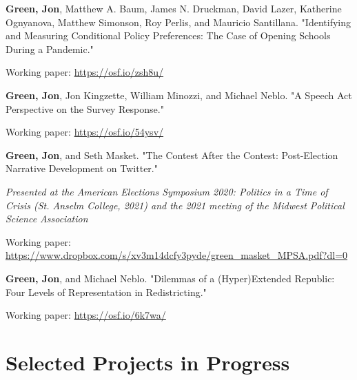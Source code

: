 \documentclass[letterpaper]{article}
\renewenvironment{itemize}{
  \begin{list}{}{
    \setlength{\leftmargin}{1.5em}
  }
}{
  \end{list}
}
\begin{document}
\begin{itemize}
\item  \textbf{Green, Jon}, Matthew A. Baum, James N. Druckman, David Lazer, Katherine Ognyanova, Matthew Simonson, Roy Perlis, and Mauricio Santillana. "Identifying and Measuring Conditional Policy Preferences: The Case of Opening Schools During a Pandemic." 
\begin{itemize}
\item Working paper: \url{https://osf.io/zsh8u/}
\end{itemize}

\item \textbf{Green, Jon}, Jon Kingzette, William Minozzi, and Michael Neblo. "A Speech Act Perspective on the Survey Response." 
\begin{itemize}
\item Working paper: \url{https://osf.io/54ysv/}
\end{itemize}

\item \textbf{Green, Jon}, and Seth Masket. "The Contest After the Contest: Post-Election Narrative Development on Twitter." 
\begin{itemize}
\item \textit{Presented at the American Elections Symposium 2020: Politics in a Time of Crisis (St. Anselm College, 2021) and the 2021 meeting of the Midwest Political Science Association}
\item Working paper: \url{https://www.dropbox.com/s/xv3m14dcfy3pyde/green_masket_MPSA.pdf?dl=0}
\end{itemize}

\item \textbf{Green, Jon}, and Michael Neblo. "Dilemmas of a (Hyper)Extended Republic: Four Levels of Representation in Redistricting." 
\begin{itemize}
\item Working paper: \url{https://osf.io/6k7wa/}
\end{itemize}

\end{itemize}

\section*{Selected Projects in Progress}
\end{document}
